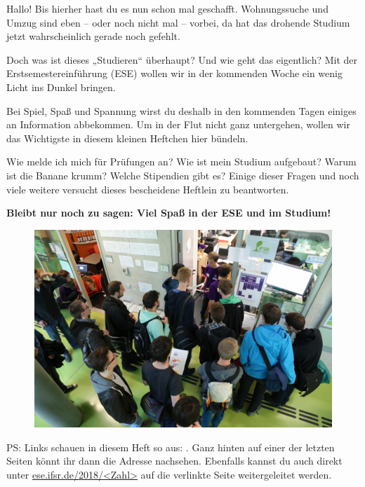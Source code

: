 

Hallo! Bis hierher hast du es nun schon mal geschafft. Wohnungssuche und Umzug sind eben -- oder noch nicht mal -- vorbei, da hat das drohende Studium jetzt wahrscheinlich gerade noch gefehlt.

Doch was ist dieses „Studieren“ überhaupt? Und wie geht das eigentlich? Mit der Erstsemestereinführung (ESE) wollen wir in der kommenden Woche ein wenig Licht ins Dunkel bringen.



Bei Spiel, Spaß und Spannung wirst du deshalb in den kommenden Tagen einiges an Information abbekommen. Um in der Flut nicht ganz untergehen, wollen wir das Wichtigste in diesem kleinen Heftchen hier bündeln.

Wie melde ich mich für Prüfungen an?  Wie ist mein Studium aufgebaut? Warum ist die Banane krumm? Welche Stipendien gibt es?
Einige dieser Fragen und noch viele weitere versucht dieses bescheidene Heftlein zu beantworten. %

\textbf{Bleibt nur noch zu sagen: Viel Spaß in der ESE und im Studium!}

\begin{figure}[b!]
	\centering
	\includegraphics[trim={0 5.5cm 0 0}, clip, width=\linewidth]{img/ese2015/bueroansturm.jpg}
\end{figure}%

\bigskip
{\small PS: Links schauen in diesem Heft so aus: . Ganz hinten auf einer der letzten Seiten könnt ihr dann die Adresse nachsehen. Ebenfalls kannst du auch direkt unter \url{ese.ifsr.de/2018/<Zahl>} auf die verlinkte Seite weitergeleitet werden.}
